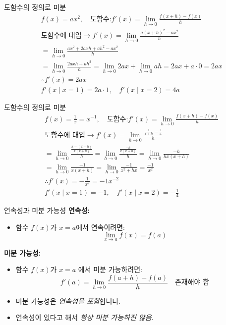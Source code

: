 \documentclass[aspectratio=169]{beamer}
\begin{document}
\begin{frame}{도함수의 정의로 미분}
  \begin{align*}
    & f(x) = ax^2, \quad \text{도함수:} f'(x) = \lim_{h \to 0} \frac{f(x+h)-f(x)}{h} \\
    & \text{도함수에 대입} \rightarrow f'(x) = \lim_{h \to 0} \frac{a(x +h)^2 - ax^2}{h} \\
    & = \lim_{h \to 0} \frac{ax^2 + 2axh + ah^2 - ax^2}{h} \\
    & = \lim_{h \to 0} \frac{2axh + ah^2}{h} = \lim_{h \to 0} 2ax + \lim_{h \to 0} ah = 2ax + a \cdot 0 = 2ax \\
    & \therefore f'(x) = 2ax \\
    & f'(x \mid x=1) = 2a\cdot 1, \quad f'(x \mid x=2) = 4a
  \end{align*}
\end{frame}

\begin{frame}{도함수의 정의로 미분}
  \begin{align*}
    & f(x) = \frac{1}{x} = x^{-1}, \quad \text{도함수:} f'(x) = \lim_{h \to 0} \frac{f(x+h)-f(x)}{h} \\
    & \text{도함수에 대입} \rightarrow f'(x) = \lim_{h \to 0} \frac{\frac{1}{x+h} - \frac{1}{x}}{h} \\
    & = \lim_{h \to 0} \frac{\frac{x - (x + h)}{x(x+h)}}{h}  = \lim_{h \to 0} \frac{\frac{-h}{x(x+h)}}{h} = \lim_{h \to 0} \frac{-h}{hx(x+h)}   \\
    & = \lim_{h \to 0} \frac{-1}{x(x+h)} = \lim_{h \to 0} \frac{-1}{x^2+hx}   = \frac{-1}{x^2} \\
    & \therefore f'(x) = -\frac{1}{x^2} = {-1}x^{-2} \\
    & f'(x \mid x=1) = -1, \quad f'(x \mid x=2) = -\frac{1}{4}
  \end{align*}
\end{frame}

\begin{frame}{연속성과 미분 가능성}
  \textbf{연속성:}
  \begin{itemize}
    \item 함수 \( f(x) \)가 \( x = a \)에서 연속이려면:
    \[\lim_{x \to a} f(x) = f(a)\]
  \end{itemize}
  
  \bigskip
  \textbf{미분 가능성:}
  \begin{itemize}
    \item 함수 \( f(x) \)가 \( x = a \) 에서 미분 가능하려면:
    \[f'(a) = \lim_{h \to 0} \frac{f(a+h)-f(a)}{h} \quad \text{존재해야 함}\]
    \item 미분 가능성은 \textit{연속성을 포함}합니다.
    \item 연속성이 있다고 해서 \textit{항상 미분 가능하진 않음}.
  \end{itemize}
\end{frame}
\end{document}
